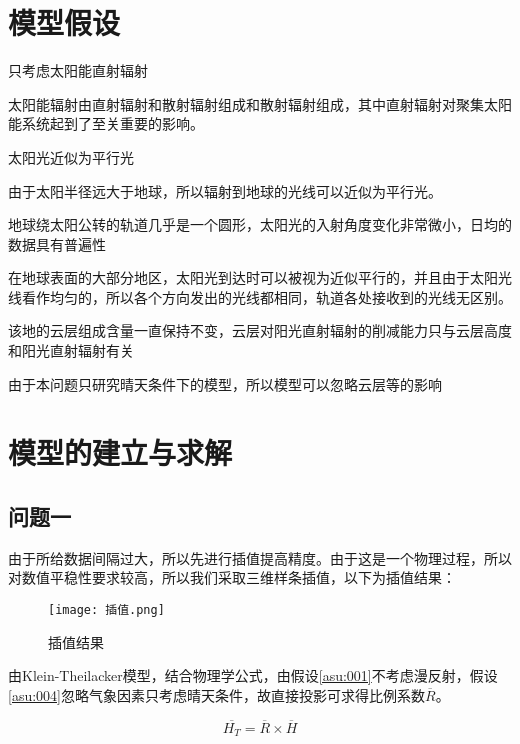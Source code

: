 \documentclass[withoutpreface,bwprint]{cumcmthesis} %
\begin{document}
\section{模型假设}

\begin{assumption}
	只考虑太阳能直射辐射
	\label{asu:001}
\end{assumption}
太阳能辐射由直射辐射和散射辐射组成和散射辐射组成，其中直射辐射对聚集太阳能系统起到了至关重要的影响。
\begin{assumption}
	太阳光近似为平行光
	\label{asu:002}
\end{assumption}
由于太阳半径远大于地球，所以辐射到地球的光线可以近似为平行光。
\begin{assumption}
	地球绕太阳公转的轨道几乎是一个圆形，太阳光的入射角度变化非常微小，日均的数据具有普遍性
	\label{asu:003}
\end{assumption}
在地球表面的大部分地区，太阳光到达时可以被视为近似平行的，并且由于太阳光线看作均匀的，所以各个方向发出的光线都相同，轨道各处接收到的光线无区别。
\begin{assumption}
	该地的云层组成含量一直保持不变，云层对阳光直射辐射的削减能力只与云层高度和阳光直射辐射有关
	\label{asu:004}
\end{assumption}
由于本问题只研究晴天条件下的模型，所以模型可以忽略云层等的影响


\section{模型的建立与求解}
\subsection{问题一}

由于所给数据间隔过大，所以先进行插值提高精度。由于这是一个物理过程，所以对数值平稳性要求较高，所以我们采取三维样条插值，以下为插值结果：

\begin{figure}[!h]
	\centering
	\texttt{[image: 插值.png]}
	\caption{插值结果}
	\label{fig:002}
\end{figure}

由Klein-Theilacker模型\cite{7}，结合物理学公式，由假设\ref{asu:001}不考虑漫反射，假设\ref{asu:004}忽略气象因素只考虑晴天条件，故直接投影可求得比例系数$\overline{R}$。

\begin{equation}
	\overline{H_{T}} = \overline{R} \times \overline{H}
	\label{eq:001}
\end{equation}
\end{document}
